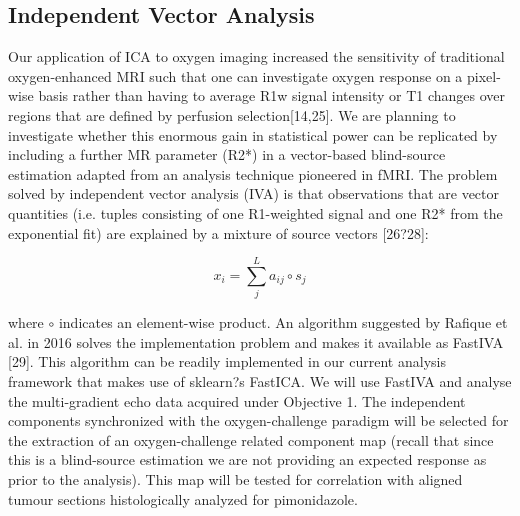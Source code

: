 \subsection{Independent Vector Analysis}

Our application of ICA to oxygen imaging increased the sensitivity of traditional oxygen-enhanced MRI such that one can investigate oxygen response on a pixel-wise basis rather than having to average R1w signal intensity or T1 changes over regions that are defined by perfusion selection[14,25]. We are planning to investigate whether this enormous gain in statistical power can be replicated by including a further MR parameter (R2*) in a vector-based blind-source estimation adapted from an analysis technique pioneered in fMRI. The problem solved by independent vector analysis (IVA) is that observations that are vector quantities (i.e. tuples consisting of one R1-weighted signal and one R2* from the exponential fit)  are explained by a mixture  of source vectors  [26?28]:

\begin{equation}
x_i = \sum_{j}^{L} a_{ij} \circ s_j
\end{equation}

where $\circ$ indicates an element-wise product. An algorithm suggested by Rafique et al. in 2016 solves the implementation problem and makes it available as FastIVA [29]. This algorithm can be readily implemented in our current analysis framework that makes use of sklearn?s FastICA. We will use FastIVA and analyse the multi-gradient echo data acquired under Objective 1. The independent components synchronized with the oxygen-challenge paradigm will be selected for the extraction of an oxygen-challenge related component map (recall that since this is a blind-source estimation we are not providing an expected response as prior to the analysis). This map will be tested for correlation with aligned tumour sections histologically analyzed for pimonidazole.

